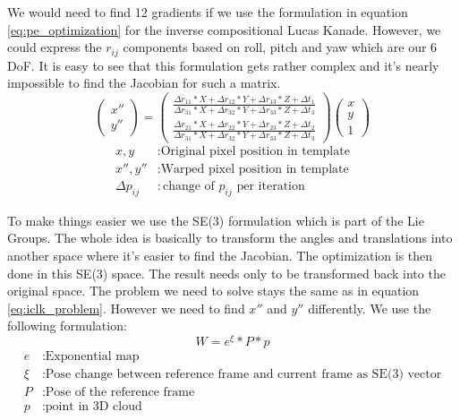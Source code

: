 \documentclass[11pt,a4paper,titlepage,oneside]{report}
\begin{document}
We would need to find 12 gradients if we use the formulation in equation \ref{eq:pe_optimization} for the inverse compositional Lucas Kanade. However, we could express the $r_{ij}$ components based on roll, pitch and yaw which are our 6 DoF. It is easy to see that this formulation gets rather complex and it's nearly impossible to find the Jacobian for such a matrix.
\begin{equation}\label{eq:pe_optimization}
	\begin{pmatrix}
		x'' \\
		y''
	\end{pmatrix}=
	\begin{pmatrix}
		\frac{\Delta r_{11}*X + \Delta r_{12}*Y + \Delta r_{13}*Z + \Delta t_{1}}{ \Delta r_{31}*X + \Delta r_{32}*Y + \Delta r_{33}*Z + \Delta t_{3}}  \\
		\frac{\Delta r_{21}*X + \Delta r_{22}*Y + \Delta r_{23}*Z + \Delta t_{2}}{ \Delta r_{31}*X + \Delta r_{32}*Y + \Delta r_{33}*Z + \Delta t_{3}}
	\end{pmatrix}
	\begin{pmatrix}
		x\\
		y\\
		1
	\end{pmatrix}
\end{equation}
\begin{align*}
	x,y						&:	\text{Original pixel position in template}\\
	x'',y''				&:	\text{Warped pixel position in template}\\
	\Delta p_{ij}	&:	\text{change of $p_{ij}$ per iteration}
\end{align*}

To make things easier we use the SE(3) formulation which is part of the Lie Groups. The whole idea is basically to transform the angles and translations into another space where it's easier to find the Jacobian. The optimization is then done in this SE(3) space. The result needs only to be transformed back into the original space. The problem we need to solve stays the same as in equation \ref{eq:iclk_problem}. However we need to find $x''$ and $y''$ differently. We use the following formulation:
\begin{equation}
	W=e^{\xi}*P*p
\end{equation}
\begin{align*}
	e			&:	\text{Exponential map}\\
	\xi		&:	\text{Pose change between reference frame and current frame as SE(3) vector}\\
	P			&:	\text{Pose of the reference frame}\\
	p			&:	\text{point in 3D cloud}
\end{align*}
\end{document}
